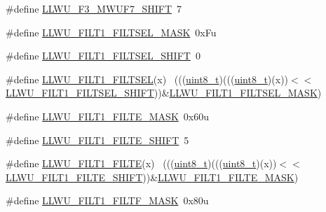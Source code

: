 \begin{DoxyCompactItemize}
\#define \hyperlink{group___l_l_w_u___register___masks_gaee31def5b074844cbf46f9d7e54d2d4f}{L\+L\+W\+U\+\_\+\+F3\+\_\+\+M\+W\+U\+F7\+\_\+\+S\+H\+I\+FT}~7
\item 
\#define \hyperlink{group___l_l_w_u___register___masks_gaa44e21d07f509d1f5d6cec9da32ab8ab}{L\+L\+W\+U\+\_\+\+F\+I\+L\+T1\+\_\+\+F\+I\+L\+T\+S\+E\+L\+\_\+\+M\+A\+SK}~0x\+Fu
\item 
\#define \hyperlink{group___l_l_w_u___register___masks_gaab2a7991b2b135f0557b1b41cc3528f7}{L\+L\+W\+U\+\_\+\+F\+I\+L\+T1\+\_\+\+F\+I\+L\+T\+S\+E\+L\+\_\+\+S\+H\+I\+FT}~0
\item 
\#define \hyperlink{group___l_l_w_u___register___masks_ga40cff44853a583ea7ff5a043a335944b}{L\+L\+W\+U\+\_\+\+F\+I\+L\+T1\+\_\+\+F\+I\+L\+T\+S\+EL}(x)                                    ~(((\hyperlink{_p_e___types_8h_aba7bc1797add20fe3efdf37ced1182c5}{uint8\+\_\+t})(((\hyperlink{_p_e___types_8h_aba7bc1797add20fe3efdf37ced1182c5}{uint8\+\_\+t})(x))$<$$<$\hyperlink{group___l_l_w_u___register___masks_gaab2a7991b2b135f0557b1b41cc3528f7}{L\+L\+W\+U\+\_\+\+F\+I\+L\+T1\+\_\+\+F\+I\+L\+T\+S\+E\+L\+\_\+\+S\+H\+I\+FT}))\&\hyperlink{group___l_l_w_u___register___masks_gaa44e21d07f509d1f5d6cec9da32ab8ab}{L\+L\+W\+U\+\_\+\+F\+I\+L\+T1\+\_\+\+F\+I\+L\+T\+S\+E\+L\+\_\+\+M\+A\+SK})
\item 
\#define \hyperlink{group___l_l_w_u___register___masks_gae449f984f9cfeec99ab8380e356b57c7}{L\+L\+W\+U\+\_\+\+F\+I\+L\+T1\+\_\+\+F\+I\+L\+T\+E\+\_\+\+M\+A\+SK}~0x60u
\item 
\#define \hyperlink{group___l_l_w_u___register___masks_ga0d4b7527c910e60bdf1f52e51b1c0932}{L\+L\+W\+U\+\_\+\+F\+I\+L\+T1\+\_\+\+F\+I\+L\+T\+E\+\_\+\+S\+H\+I\+FT}~5
\item 
\#define \hyperlink{group___l_l_w_u___register___masks_ga8e8244f4f88e8763dea3366dbfdd36a6}{L\+L\+W\+U\+\_\+\+F\+I\+L\+T1\+\_\+\+F\+I\+L\+TE}(x)                                        ~(((\hyperlink{_p_e___types_8h_aba7bc1797add20fe3efdf37ced1182c5}{uint8\+\_\+t})(((\hyperlink{_p_e___types_8h_aba7bc1797add20fe3efdf37ced1182c5}{uint8\+\_\+t})(x))$<$$<$\hyperlink{group___l_l_w_u___register___masks_ga0d4b7527c910e60bdf1f52e51b1c0932}{L\+L\+W\+U\+\_\+\+F\+I\+L\+T1\+\_\+\+F\+I\+L\+T\+E\+\_\+\+S\+H\+I\+FT}))\&\hyperlink{group___l_l_w_u___register___masks_gae449f984f9cfeec99ab8380e356b57c7}{L\+L\+W\+U\+\_\+\+F\+I\+L\+T1\+\_\+\+F\+I\+L\+T\+E\+\_\+\+M\+A\+SK})
\item 
\#define \hyperlink{group___l_l_w_u___register___masks_gabdb5ca902522996074a75ed08a7a8b03}{L\+L\+W\+U\+\_\+\+F\+I\+L\+T1\+\_\+\+F\+I\+L\+T\+F\+\_\+\+M\+A\+SK}~0x80u

\end{DoxyCompactItemize}
